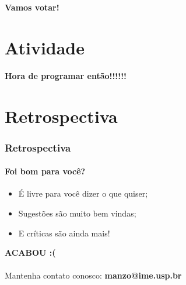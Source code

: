 \documentclass{beamer}
\begin{document}
\begin{frame}
  \LARGE{\textbf{Vamos votar!}}
\end{frame}

\section{Atividade}
\begin{frame}
  \LARGE{\textbf{Hora de programar então!!!!!!}}
\end{frame}

\section{Retrospectiva}
\begin{frame}
  \frametitle{Retrospectiva}
  \framesubtitle{Foi bom para você?}

  \begin{itemize}
    \item É livre para você dizer o que quiser;
    \item Sugestões são muito bem vindas;
    \item E críticas são ainda mais!
  \end{itemize}
\end{frame}

\begin{frame}
  \LARGE{\textbf{ACABOU :(}} \\~\\

  Mantenha contato conosco:
  \textbf{manzo@ime.usp.br}
\end{frame}
\end{document}
